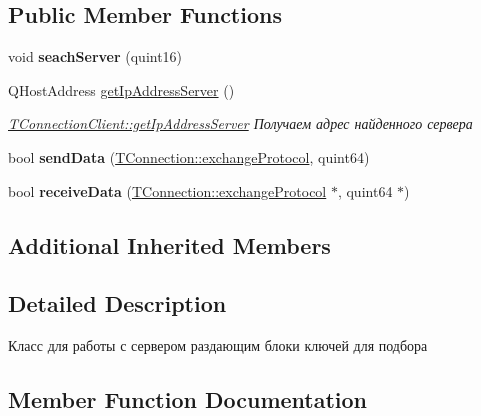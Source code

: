 \subsection*{Public Member Functions}
\begin{DoxyCompactItemize}
\item 
\mbox{\label{classconnection_1_1_t_connection_client_a7aa7cdc07cac6d969ec27518baad8b33}} 
void {\bfseries seach\+Server} (quint16)
\item 
Q\+Host\+Address \hyperlink{classconnection_1_1_t_connection_client_a00738647cc6afff4d98185faa375ddb4}{get\+Ip\+Address\+Server} ()
\begin{DoxyCompactList}\small\item\em \hyperlink{classconnection_1_1_t_connection_client_a00738647cc6afff4d98185faa375ddb4}{T\+Connection\+Client\+::get\+Ip\+Address\+Server} Получаем адрес найденного сервера \end{DoxyCompactList}\item 
\mbox{\label{classconnection_1_1_t_connection_client_a3b902734ae0765b81906eaf987534969}} 
bool {\bfseries send\+Data} (\hyperlink{classconnection_1_1_t_connection_a3550181cb2fa72eccfa55d23f45cea34}{T\+Connection\+::exchange\+Protocol}, quint64)
\item 
\mbox{\label{classconnection_1_1_t_connection_client_aa4945db8ce32628f90b943c413ffacdc}} 
bool {\bfseries receive\+Data} (\hyperlink{classconnection_1_1_t_connection_a3550181cb2fa72eccfa55d23f45cea34}{T\+Connection\+::exchange\+Protocol} $\ast$, quint64 $\ast$)
\end{DoxyCompactItemize}
\subsection*{Additional Inherited Members}


\subsection{Detailed Description}
Класс для работы с сервером раздающим блоки ключей для подбора 

\subsection{Member Function Documentation}
\mbox{\label{classconnection_1_1_t_connection_client_a00738647cc6afff4d98185faa375ddb4}} 
